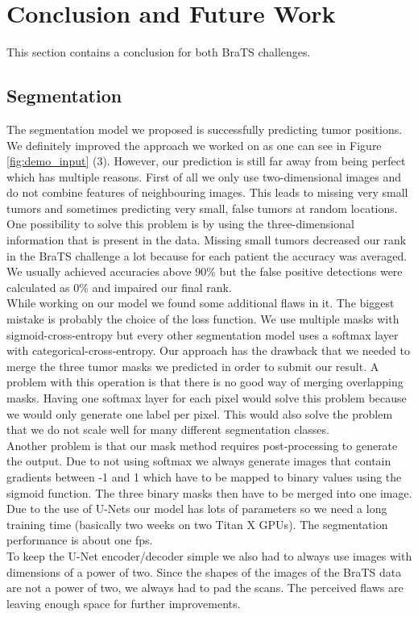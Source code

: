 \documentclass[a4paper,12pt,pagesize,headsepline,bibtotoc,titlepage]{scrartcl}
\begin{document}
\newpage

\section{Conclusion and Future Work}
\label{sec:conclusion}

This section contains a conclusion for both BraTS challenges.

\subsection{Segmentation}

The segmentation model we proposed is successfully predicting tumor positions.
We definitely improved the approach we worked on as one can see in Figure \ref{fig:demo_input} (3).
However, our prediction is still far away from being perfect which has multiple reasons.
First of all we only use two-dimensional images and do not combine features of neighbouring images.
This leads to missing very small tumors and sometimes predicting very small, false  tumors at random locations.
One possibility to solve this problem is by using the three-dimensional information that is present in the data.
Missing small tumors decreased our rank in the BraTS challenge a lot because for each patient the accuracy was averaged.
We usually achieved accuracies above 90\% but the false positive detections were calculated as 0\% and impaired our final rank.\\
While working on our model we found some additional flaws in it.
The biggest mistake is probably the choice of the loss function.
We use multiple masks with sigmoid-cross-entropy but every other segmentation model uses a softmax layer with categorical-cross-entropy.
Our approach has the drawback that we needed to merge the three tumor masks we predicted in order to submit our result.
A problem with this operation is that there is no good way of merging overlapping masks.
Having one softmax layer for each pixel would solve this problem because we would only generate one label per pixel.
This would also solve the problem that we do not scale well for many different segmentation classes.\\
Another problem is that our mask method requires post-processing to generate the output.
Due to not using softmax we always generate images that contain gradients between -1 and 1 which have to be mapped to binary values using the sigmoid function.
The three binary masks then have to be merged into one image.\\
Due to the use of U-Nets our model has lots of parameters so we need a long training time (basically two weeks on two Titan X GPUs). The segmentation performance is about one fps.\\
To keep the U-Net encoder/decoder simple we also had to always use images with dimensions of a power of two.
Since the shapes of the images of the BraTS data are not a power of two, we always had to pad the scans.
The perceived flaws are leaving enough space for further improvements.
\end{document}
